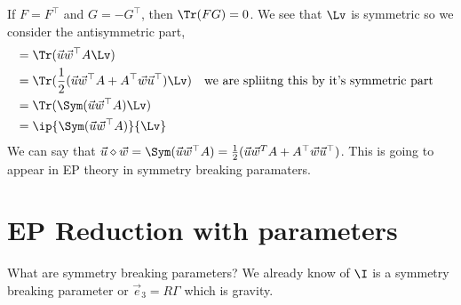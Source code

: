 
\noindent
If $F = F^\top$ and $G = -G^\top$, then $\Tr(FG) = 0$. We see that $\Lv$ is symmetric so we consider the antisymmetric part,
\begin{align*}
  &= \Tr(\vec u\vec w^\top A \Lv )\\
  &= \Tr (\frac{1}{2}(\vec u\vec w^\top A + A^\top \vec w\vec u^\top)\Lv ) && \text{we are spliitng this by it's symmetric part} \\
  &= \Tr(\Sym(\vec u\vec w^\top A)\Lv) \\
  &= \ip{\Sym(\vec u\vec w^\top A)}{\Lv}
\end{align*}
We can say that $\vec u \diamond \vec w = \Sym(\vec u\vec w^\top A) = \frac{1}{2}(\vec u\vec w^T A + A^\top \vec w\vec u^\top)$. This is going to appear in EP theory in symmetry breaking paramaters.

\section{EP Reduction with parameters}

What are symmetry breaking parameters? We already know of $\I$ is a symmetry breaking parameter or $\vec e_3 = R\Gamma$ which is gravity.\\

